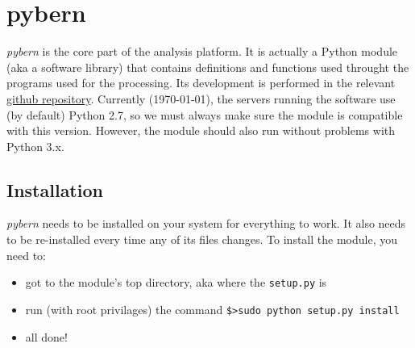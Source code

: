 \chapter{pybern}
\label{ch:pybern}

\emph{pybern} is the core part of the analysis platform. It is 
actually a Python module (aka a software library) that contains definitions and 
functions used throught the programs used for the processing. Its development 
is performed in the relevant \href{https://github.com/DSOlab/autobern}{github repository}. 
Currently (\today), the servers running the software use (by default) Python 2.7, 
so we must always make sure the module is compatible with this version. However, 
the module should also run without problems with Python 3.x.

\section{Installation}
\label{sec:pybern-installation}
\emph{pybern} needs to be installed on your system for everything to work. It also 
needs to be re-installed every time any of its files changes. To install the 
module, you need to:
\begin{itemize}
  \item got to the module's top directory, aka where the \verb|setup.py| is
  \item run (with root privilages) the command \verb|$>sudo python setup.py install|
  \item all done!
\end{itemize}